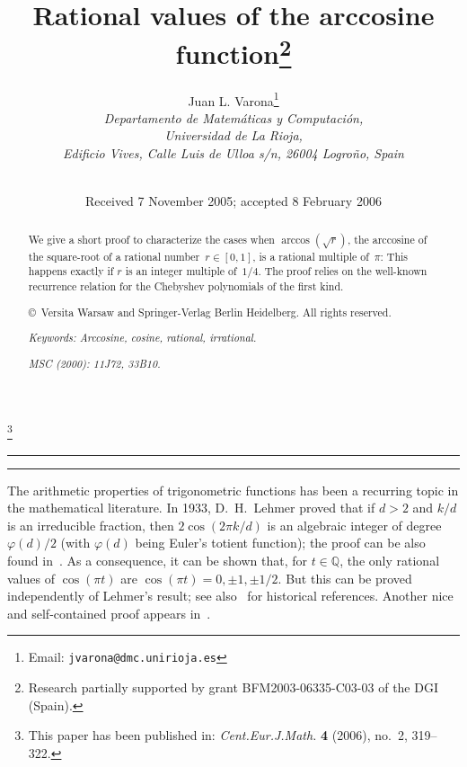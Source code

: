 \documentclass[10pt,a4paper]{article}
\title{\bfseries Rational values of the arccosine function\thanks{Research partially 
supported by grant BFM2003-06335-C03-03 of the DGI (Spain).}}
\author{{\Large Juan L. Varona\thanks{Email: \texttt{jvarona@dmc.unirioja.es}}}\\[5pt]
\textit{\small Departamento de Matem\'aticas y Computaci\'on,}\\[-2pt]
\textit{\small Universidad de La Rioja,}\\[-2pt]
\textit{\small Edificio Vives, Calle Luis de Ulloa s/n,
26004 Logro\~no, Spain}}
\date{\small \leavevmode\\[5pt] \hfill Received 7 November 2005; 
accepted 8 February 2006}
\newcommand{\Q}{\mathbb{Q}}
\theoremstyle{remark}
\begin{document}

\maketitle

\renewcommand\thefootnote{}
\renewcommand\footnotemark{}
\footnote{This paper has been published in: \textit{Cent.\@ Eur.\@ J.\@ Math.\@}
\textbf{4} (2006), no.~2, 319--322.}

\vspace*{-1cm}\hrule
\begin{abstract}\parindent=0pt\noindent
We give a short proof to characterize the cases when
$\arccos(\sqrt{r})$, the arccosine
of the square-root of a rational number~$r \in [0,1]$,
is a rational multiple of~$\pi$:
This happens exactly if $r$ is an integer multiple of~$1/4$.
The proof relies on the well-known recurrence relation for the
Chebyshev polynomials of the first kind.

\copyright\ Versita Warsaw and Springer-Verlag Berlin Heidelberg.
All rights reserved.
\bigskip

\textit{Keywords: Arccosine, cosine, rational, irrational.}

\textit{MSC (2000): 11J72, 33B10.}
\end{abstract}
\hrule\bigskip
\bigskip

The arithmetic properties of trigonometric functions has been
a recurring topic in the mathematical literature. In 1933,
D.~H.~Lehmer \cite{Leh} proved that if $d>2$ and $k/d$ is an
irreducible fraction, then $2\cos(2\pi k/d)$ is an algebraic
integer of degree $\varphi(d)/2$ (with $\varphi(d)$ being
Euler's totient function); the proof can be also found
in~\cite[Theorem~3.9]{Ni}. As a consequence, it can be shown
that, for $t \in \Q$, the only rational values of
$\cos(\pi t)$ are $\cos(\pi t) = 0, \pm1, \pm1/2$. But this can
be proved independently of Lehmer's result; see also~\cite[Chapter~3]{Ni}
for historical references.
Another nice and self-contained proof appears
in~\cite[\S\,6.3, Theorem~6.16]{NiZuMo}.
\end{document}
